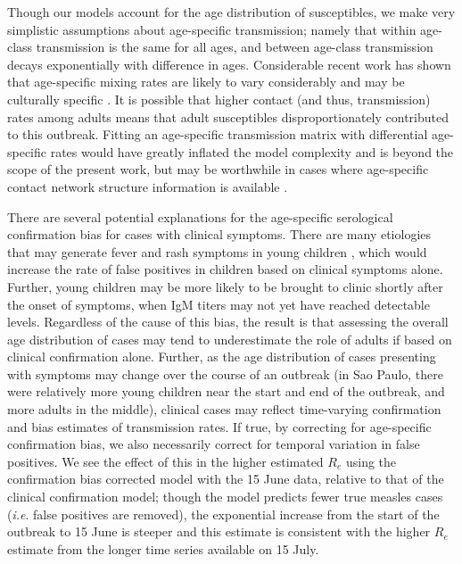 Though our models account for the age distribution of susceptibles, we make very simplistic assumptions about age-specific transmission; namely that within age-class transmission is the same for all ages, and between age-class transmission decays exponentially with difference in ages. Considerable recent work has shown that age-specific mixing rates are likely to vary considerably and may be culturally specific \cite{Mossong_2008}. It is possible that higher contact (and thus, transmission) rates among adults means that adult susceptibles disproportionately contributed to this outbreak. Fitting an age-specific transmission matrix with differential age-specific rates would have greatly inflated the model complexity and is beyond the scope of the present work, but may be worthwhile in cases where age-specific contact network structure information is available \cite{327793}.

There are several potential explanations for the age-specific serological confirmation bias for cases with clinical symptoms. There are many etiologies that may generate fever and rash symptoms in young children \cite{Hutchins_2004,Ho_2014,GUY_2004,31c964}, which would increase the rate of false positives in children based on clinical symptoms alone. Further, young children may be more likely to be brought to clinic shortly after the onset of symptoms, when IgM titers may not yet have reached detectable levels. Regardless of the cause of this bias, the result is that assessing the overall age distribution of cases may tend to underestimate the role of adults if based on clinical confirmation alone. Further, as the age distribution of cases presenting with symptoms may change over the course of an outbreak (in Sao Paulo, there were relatively more young children near the start and end of the outbreak, and more adults in the middle), clinical cases may reflect time-varying confirmation and bias estimates of transmission rates. If true, by correcting for age-specific confirmation bias, we also necessarily correct for temporal variation in false positives. We see the effect of this in the higher estimated $R_e$ using the confirmation bias corrected model with the 15 June data, relative to that of the clinical confirmation model; though the model predicts fewer true measles cases (\emph{i.e}. false positives are removed), the exponential increase from the start of the outbreak to 15 June is steeper and this estimate is consistent with the higher $R_e$ estimate from the longer time series available on 15 July.

